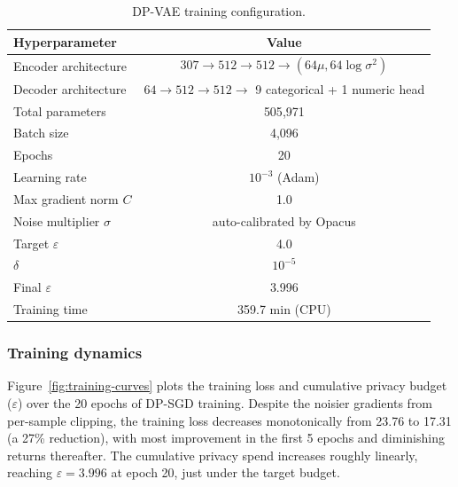 \documentclass[12pt,letterpaper]{article}
\renewcommand{\_}{\textunderscore\allowbreak}
\begin{document}
\begin{table}[H]
\centering
\begin{tabular*}{\textwidth}{@{\extracolsep{\fill}}lc}
\toprule
\textbf{Hyperparameter} & \textbf{Value} \\
\midrule
Encoder architecture & $307 \to 512 \to 512 \to (64\mu, 64\log\sigma^2)$ \\
Decoder architecture & $64 \to 512 \to 512 \to$ 9 categorical + 1 numeric head \\
Total parameters & 505{,}971 \\
Batch size & 4{,}096 \\
Epochs & 20 \\
Learning rate & $10^{-3}$ (Adam) \\
Max gradient norm $C$ & 1.0 \\
Noise multiplier $\sigma$ & auto-calibrated by Opacus \\
Target $\varepsilon$ & 4.0 \\
$\delta$ & $10^{-5}$ \\
Final $\varepsilon$ & 3.996 \\
Training time & 359.7 min (CPU) \\
\bottomrule
\end{tabular*}
\caption{DP-VAE training configuration.}
\label{tab:hyperparams}
\end{table}

\subsubsection{Training dynamics}

Figure~\ref{fig:training-curves} plots the training loss and cumulative privacy budget ($\varepsilon$) over the 20 epochs of DP-SGD training. Despite the noisier gradients from per-sample clipping, the training loss decreases monotonically from 23.76 to 17.31 (a 27\% reduction), with most improvement in the first 5 epochs and diminishing returns thereafter. The cumulative privacy spend increases roughly linearly, reaching $\varepsilon = 3.996$ at epoch 20, just under the target budget.
\end{document}
